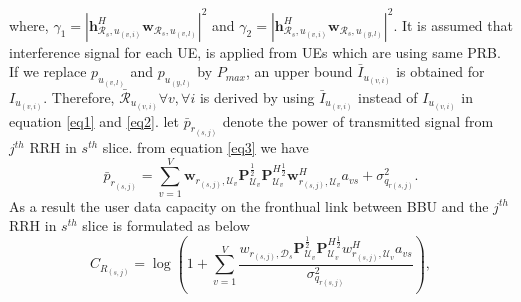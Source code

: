 \documentclass[conference]{IEEEtran}
\begin{document}
where, $\gamma_{1} =|\boldsymbol{h}_{\mathcal{R}_s, u_{(v,i)}}^H \boldsymbol{w}_{\mathcal{R}_{s},u_{(v,l)}}|^2$
and $\gamma_{2} =|\boldsymbol{h}_{\mathcal{R}_s, u_{(v,i)}}^H \boldsymbol{w}_{\mathcal{R}_{s},u_{(y,l)}}|^2$.
It is assumed that interference signal for each UE, is applied from UEs which are using same PRB.
If we replace $p_{u_{(v,l)}}$ and $p_{u_{(y,l)}}$ by $P_{max}$, an upper bound $\bar{I}_{u_{(v,i)}}$ is obtained for $I_{u_{(v,i)}}$. Therefore, $\bar{\mathcal{R}}_{u_{(v,i)}} \forall v , \forall i$ is derived by using $\bar{I}_{u_{(v,i)}}$ instead of $I_{u_{(v,i)}}$ in equation \eqref{eq1} and \eqref{eq2}.\newline
let $\bar{p}_{r_{(s,j)}}$ denote the power of transmitted signal from $j^{th}$ RRH in $s^{th}$ slice.
from equation \eqref{eq3} we have
\begin{equation}
\bar{p}_{r_{(s,j)}} = \sum_{v=1}^{V}\boldsymbol{w}_{r_{(s,j)},\mathcal{U}_{v}} \boldsymbol{P}_{\mathcal{U}_v}^{\frac{1}{2}} \boldsymbol{P}_{\mathcal{U}_v}^{H \frac{1}{2}}   \boldsymbol{w}_{r_{(s,j)},\mathcal{U}_{v}}^H a_{vs} + \sigma_{q_{r(s,j)}}^2.
\end{equation}
As a result the user data capacity on the fronthual link between BBU and the $j^{th}$ RRH in $s^{th}$ slice is formulated as below
\begin{equation}
C_{R_{(s,j)}} = \log{(1+\sum_{v=1}^{V}\frac{w_{r_{(s,j)},\mathcal{D}_{s}} \boldsymbol{P}_{\mathcal{U}_v}^{\frac{1}{2}} \boldsymbol{P}_{\mathcal{U}_v}^{H \frac{1}{2}}   w_{r_{(s,j)},\mathcal{U}_{v}}^H a_{vs}}{ \sigma_{q_{r(s,j)}}^2})},
\end{equation}
\end{document}

